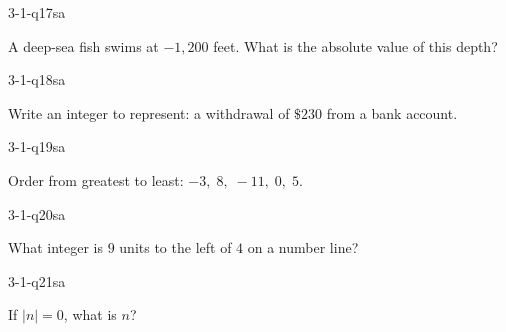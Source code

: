 \begin{practiceQuestion}{3-1-q17}{sa}
\begin{questionText}
A deep-sea fish swims at $-1{,}200$ feet. What is the absolute value of this depth?
\end{questionText}
\end{practiceQuestion}

\begin{practiceQuestion}{3-1-q18}{sa}
\begin{questionText}
Write an integer to represent: a withdrawal of $\$230$ from a bank account.
\end{questionText}
\end{practiceQuestion}

\begin{practiceQuestion}{3-1-q19}{sa}
\begin{questionText}
Order from greatest to least: $-3, \; 8, \; -11, \; 0, \; 5$.
\end{questionText}
\end{practiceQuestion}

\begin{practiceQuestion}{3-1-q20}{sa}
\begin{questionText}
What integer is $9$ units to the left of $4$ on a number line?
\end{questionText}
\end{practiceQuestion}

\begin{practiceQuestion}{3-1-q21}{sa}
\begin{questionText}
If $|n| = 0$, what is $n$?
\end{questionText}
\end{practiceQuestion}


